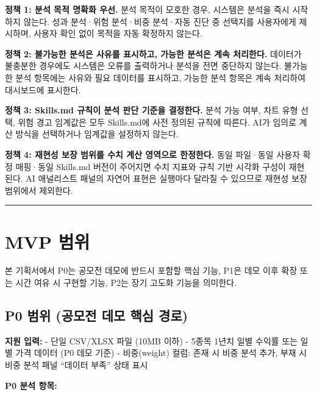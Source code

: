 \documentclass[10pt,a4paper]{article}
\begin{document}
\textbf{정책 1: 분석 목적 명확화 우선.}
분석 목적이 모호한 경우, 시스템은 분석을 즉시 시작하지 않는다. 성과 분석·위험 분석·비중 분석·자동 진단 중 선택지를 사용자에게 제시하며, 사용자 확인 없이 목적을 자동 확정하지 않는다.

\textbf{정책 2: 불가능한 분석은 사유를 표시하고, 가능한 분석은 계속 처리한다.}
데이터가 불충분한 경우에도 시스템은 오류를 출력하거나 분석을 전면 중단하지 않는다. 불가능한 분석 항목에는 사유와 필요 데이터를 표시하고, 가능한 분석 항목은 계속 처리하여 대시보드에 표시한다.

\textbf{정책 3: Skills.md 규칙이 분석 판단 기준을 결정한다.}
분석 가능 여부, 차트 유형 선택, 위험 경고 임계값은 모두 Skills.md에 사전 정의된 규칙에 따른다. AI가 임의로 계산 방식을 선택하거나 임계값을 설정하지 않는다.

\textbf{정책 4: 재현성 보장 범위를 수치 계산 영역으로 한정한다.}
동일 파일·동일 사용자 확정 매핑·동일 Skills.md 버전이 주어지면 수치 지표와 규칙 기반 시각화 구성이 재현된다. AI 애널리스트 패널의 자연어 표현은 실행마다 달라질 수 있으므로 재현성 보장 범위에서 제외한다.

\begin{center}\rule{0.5\linewidth}{0.5pt}\end{center}

\section{MVP 범위}\label{mvp-uxbc94uxc704}

본 기획서에서 P0는 공모전 데모에 반드시 포함할 핵심 기능, P1은 데모 이후 확장 또는 시간 여유 시 구현할 기능, P2는 장기 고도화 기능을 의미한다.

\subsection{P0 범위 (공모전 데모 핵심 경로)}\label{p0-uxbc94uxc704-uxacf5uxbaa8uxc804-uxb370uxbaa8-uxd575uxc2ec-uxacbduxb85c}

\textbf{지원 입력:}
- 단일 CSV/XLSX 파일 (10MB 이하)
- 5종목 1년치 일별 수익률 또는 일별 가격 데이터 (P0 데모 기준)
- 비중(weight) 컬럼: 존재 시 비중 분석 추가, 부재 시 비중 분석 패널 ``데이터 부족'' 상태 표시

\textbf{P0 분석 항목:}
\end{document}
